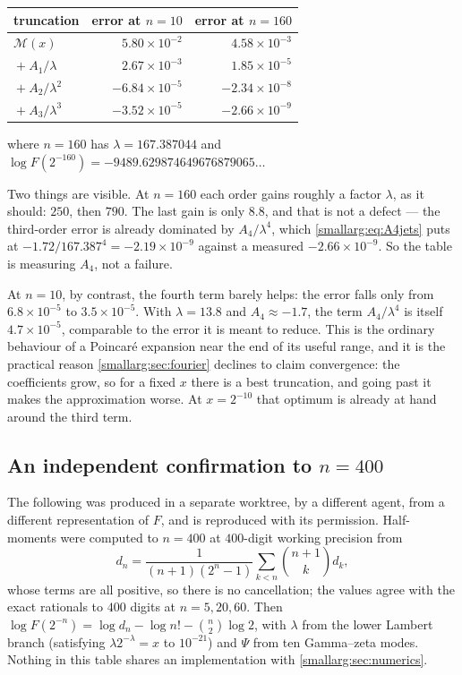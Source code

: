 \documentclass[11pt,oneside]{article}
\theoremstyle{definition}
\theoremstyle{remark}
\begin{document}
\begin{center}\small
\begin{tabular}{@{}lrr@{}}
\toprule
truncation & error at $n=10$ & error at $n=160$\\
\midrule
$\mathcal M(x)$ & $5.80\times10^{-2}$ & $4.58\times10^{-3}$\\
${}+A_1/\lambda$ & $2.67\times10^{-3}$ & $1.85\times10^{-5}$\\
${}+A_2/\lambda^2$ & $-6.84\times10^{-5}$ & $-2.34\times10^{-8}$\\
${}+A_3/\lambda^3$ & $-3.52\times10^{-5}$ & $-2.66\times10^{-9}$\\
\bottomrule
\end{tabular}
\end{center}

where $n=160$ has $\lambda=167.387044$ and
$\log F(2^{-160})=-9489.629874649676879065\dots$

Two things are visible.  At $n=160$ each order gains roughly a factor
$\lambda$, as it should: $250$, then $790$.  The last gain is only $8.8$,
and that is not a defect --- the third-order error is already dominated by
$A_4/\lambda^4$, which \cref{smallarg:eq:A4jets} puts at
$-1.72/167.387^4=-2.19\times10^{-9}$ against a measured
$-2.66\times10^{-9}$.  So the table is measuring $A_4$, not a failure.

At $n=10$, by contrast, the fourth term barely helps: the error falls only
from $6.8\times10^{-5}$ to $3.5\times10^{-5}$.  With $\lambda=13.8$ and
$A_4\approx-1.7$, the term $A_4/\lambda^4$ is itself $4.7\times10^{-5}$,
comparable to the error it is meant to reduce.  This is the ordinary
behaviour of a Poincar\'e expansion near the end of its useful range, and it
is the practical reason \cref{smallarg:sec:fourier} declines to claim convergence:
the coefficients grow, so for a fixed $x$ there is a best truncation, and
going past it makes the approximation worse.  At $x=2^{-10}$ that optimum is
already at hand around the third term.

\subsection{An independent confirmation to \texorpdfstring{$n=400$}{n=400}}

The following was produced in a separate worktree, by a different agent,
from a different representation of $F$, and is reproduced with its
permission.  Half-moments were computed to $n=400$ at $400$-digit working
precision from
\[
  d_n=\frac1{(n+1)(2^n-1)}\sum_{k<n}\binom{n+1}{k}d_k,
\]
whose terms are all positive, so there is no cancellation; the values agree
with the exact rationals to $400$ digits at $n=5,20,60$.  Then
$\log F(2^{-n})=\log d_n-\log n!-\binom n2\log2$, with $\lambda$ from the
lower Lambert branch (satisfying $\lambda2^{-\lambda}=x$ to $10^{-21}$) and
$\Psi$ from ten Gamma--zeta modes.  Nothing in this table shares an
implementation with \cref{smallarg:sec:numerics}.
\end{document}
